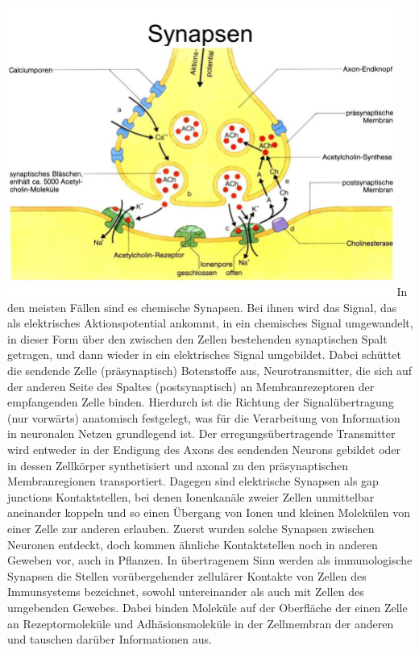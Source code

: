 \includegraphics[width=0.95\textwidth]{lectures/160405/pix/synapse.jpg}
In den meisten Fällen sind es chemische Synapsen. Bei ihnen wird das Signal, das als elektrisches Aktionspotential ankommt, in ein chemisches Signal umgewandelt, in dieser Form über den zwischen den Zellen bestehenden synaptischen Spalt getragen, und dann wieder in ein elektrisches Signal umgebildet. Dabei schüttet die sendende Zelle (präsynaptisch) Botenstoffe aus, Neurotransmitter, die sich auf der anderen Seite des Spaltes (postsynaptisch) an Membranrezeptoren der empfangenden Zelle binden. Hierdurch ist die Richtung der Signalübertragung (nur vorwärts) anatomisch festgelegt, was für die Verarbeitung von Information in neuronalen Netzen grundlegend ist. Der erregungsübertragende Transmitter wird entweder in der Endigung des Axons des sendenden Neurons gebildet oder in dessen Zellkörper synthetisiert und axonal zu den präsynaptischen Membranregionen transportiert.
Dagegen sind elektrische Synapsen als gap junctions Kontaktstellen, bei denen Ionenkanäle zweier Zellen unmittelbar aneinander koppeln und so einen Übergang von Ionen und kleinen Molekülen von einer Zelle zur anderen erlauben. Zuerst wurden solche Synapsen zwischen Neuronen entdeckt, doch kommen ähnliche Kontaktstellen noch in anderen Geweben vor, auch in Pflanzen.
In übertragenem Sinn werden als immunologische Synapsen die Stellen vorübergehender zellulärer Kontakte von Zellen des Immunsystems bezeichnet, sowohl untereinander als auch mit Zellen des umgebenden Gewebes. Dabei binden Moleküle auf der Oberfläche der einen Zelle an Rezeptormoleküle und Adhäsionsmoleküle in der Zellmembran der anderen und tauschen darüber Informationen aus.

